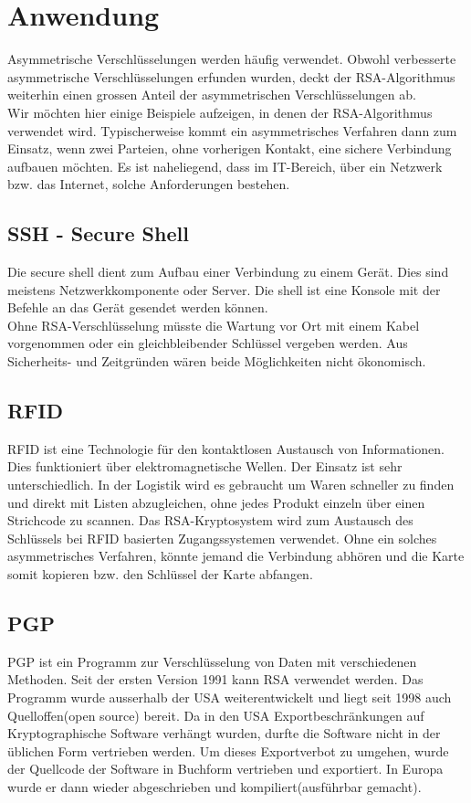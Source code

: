 \section{Anwendung}
Asymmetrische Verschlüsselungen werden häufig verwendet.  Obwohl verbesserte asymmetrische Verschlüsselungen erfunden wurden, deckt der RSA-Algorithmus weiterhin einen grossen Anteil der asymmetrischen Verschlüsselungen ab.\\
Wir möchten hier einige Beispiele aufzeigen, in denen der RSA-Algorithmus verwendet wird. Typischerweise kommt ein asymmetrisches Verfahren dann zum Einsatz, wenn zwei Parteien, ohne vorherigen Kontakt, eine sichere Verbindung aufbauen möchten. Es ist naheliegend, dass im IT-Bereich, über ein Netzwerk bzw. das Internet, solche Anforderungen bestehen.
%
\subsection{SSH - Secure Shell}
Die secure shell dient zum Aufbau einer Verbindung zu einem Gerät. Dies sind meistens Netzwerkkomponente oder Server. Die shell ist eine Konsole mit der Befehle an das Gerät gesendet werden können.\\
Ohne RSA-Verschlüsselung müsste die Wartung vor Ort mit einem Kabel vorgenommen oder ein gleichbleibender Schlüssel vergeben werden. Aus Sicherheits- und Zeitgründen wären beide Möglichkeiten nicht ökonomisch.
%
\subsection{RFID}
RFID ist eine Technologie für den kontaktlosen Austausch von Informationen. Dies funktioniert über elektromagnetische Wellen. Der Einsatz ist sehr unterschiedlich. In der Logistik wird es gebraucht um Waren schneller zu finden und direkt mit Listen abzugleichen, ohne jedes Produkt einzeln über einen Strichcode zu scannen. Das RSA-Kryptosystem wird zum Austausch des Schlüssels bei RFID basierten Zugangssystemen verwendet. Ohne ein solches asymmetrisches Verfahren, könnte jemand die Verbindung abhören und die Karte somit kopieren bzw. den Schlüssel der Karte abfangen.

\subsection{PGP}
PGP ist ein Programm zur Verschlüsselung von Daten mit verschiedenen Methoden. Seit der ersten Version 1991 kann RSA verwendet werden. Das Programm wurde ausserhalb der USA weiterentwickelt und liegt seit 1998 auch Quelloffen(open source) bereit. Da in den USA Exportbeschränkungen auf Kryptographische Software verhängt wurden, durfte die Software nicht in der üblichen Form vertrieben werden. Um dieses Exportverbot zu umgehen, wurde der Quellcode der Software in Buchform vertrieben und exportiert. In Europa wurde er dann wieder abgeschrieben und kompiliert(ausführbar gemacht). 

